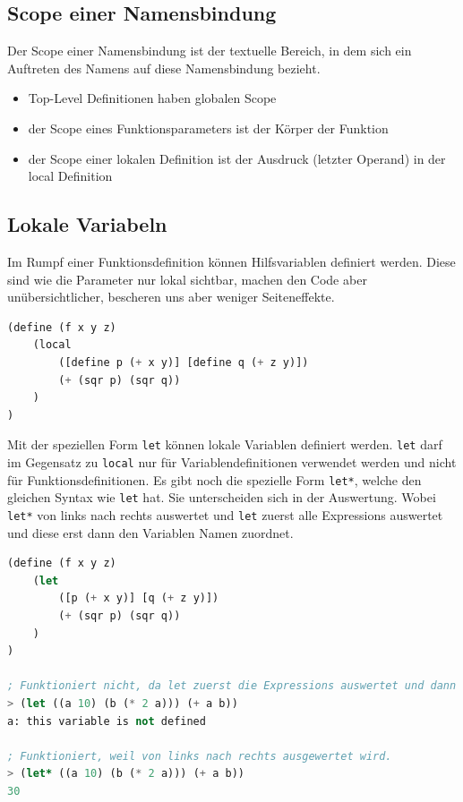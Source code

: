 \subsection{Scope einer Namensbindung}
Der Scope einer Namensbindung ist der textuelle Bereich, in dem sich ein Auftreten des Namens auf diese Namensbindung bezieht.
\begin{itemize}
	\item Top-Level Definitionen haben globalen Scope
	\item der Scope eines Funktionsparameters ist der Körper der Funktion
	\item der Scope einer lokalen Definition ist der Ausdruck (letzter Operand) in der local Definition
\end{itemize}

\subsection{Lokale Variabeln}
Im Rumpf einer Funktionsdefinition können Hilfsvariablen definiert werden. Diese sind wie die Parameter nur lokal sichtbar, machen den Code aber unübersichtlicher, bescheren uns aber weniger Seiteneffekte.

\begin{lstlisting}[language=Lisp, caption=Lokale Variablen mit local]
(define (f x y z)
	(local
		([define p (+ x y)] [define q (+ z y)])
		(+ (sqr p) (sqr q))
	)
)
\end{lstlisting}

Mit der speziellen Form \verb|let| können lokale Variablen definiert werden. \verb|let| darf im Gegensatz zu \verb|local| nur für Variablendefinitionen verwendet werden und nicht für Funktionsdefinitionen. Es gibt noch die spezielle Form \verb|let*|, welche den gleichen Syntax wie \verb|let| hat. Sie unterscheiden sich in der Auswertung. Wobei \verb|let*| von links nach rechts auswertet und \verb|let| zuerst alle Expressions auswertet und diese erst dann den Variablen Namen zuordnet.

\begin{lstlisting}[language=Lisp, caption=Lokale Variablen mit let]
(define (f x y z)
	(let
		([p (+ x y)] [q (+ z y)])
		(+ (sqr p) (sqr q))
	)
)

; Funktioniert nicht, da let zuerst die Expressions auswertet und dann erst die Zuweisung macht. Die Variable a muss vorgängig definiert werden.
> (let ((a 10) (b (* 2 a))) (+ a b))
a: this variable is not defined

; Funktioniert, weil von links nach rechts ausgewertet wird.
> (let* ((a 10) (b (* 2 a))) (+ a b))
30
\end{lstlisting}

